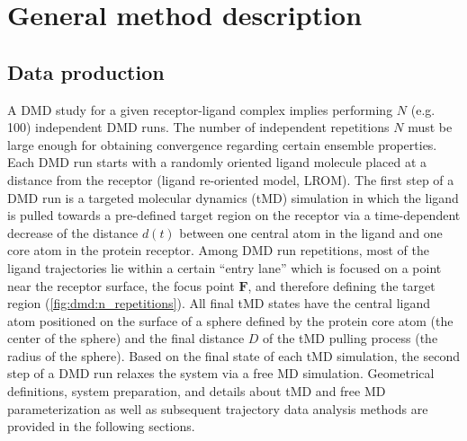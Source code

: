 \section{General method description}
\subsection{Data production}

A DMD study for a given receptor-ligand complex implies performing $N$ (e.g.
100) independent DMD runs. The number of independent repetitions $N$ must be
large enough for obtaining convergence regarding certain ensemble properties.
Each DMD run starts with a randomly oriented ligand molecule placed at a
distance from the receptor (ligand re-oriented model, LROM). The first step of a
DMD run is a targeted molecular dynamics (tMD) simulation in which the ligand is
pulled towards a pre-defined target region on the receptor via a time-dependent
decrease of the distance $d(t)$ between one central atom in the ligand and one
core atom in the protein receptor. Among DMD run repetitions, most of the ligand
trajectories lie within a certain \enquote{entry lane} which is focused on a
point near the receptor surface, the focus point $\bm{F}$, and therefore
defining the target region (\cref{fig:dmd:n_repetitions}). All final tMD states
have the central ligand atom positioned on the surface of a sphere defined by
the protein core atom (the center of the sphere) and the final distance $D$ of
the tMD pulling process (the radius of the sphere). Based on the final state of
each tMD simulation, the second step of a DMD run relaxes the system via a free
MD simulation. Geometrical definitions, system preparation, and details about
tMD and free MD parameterization as well as subsequent trajectory data analysis
methods are provided in the following sections.

